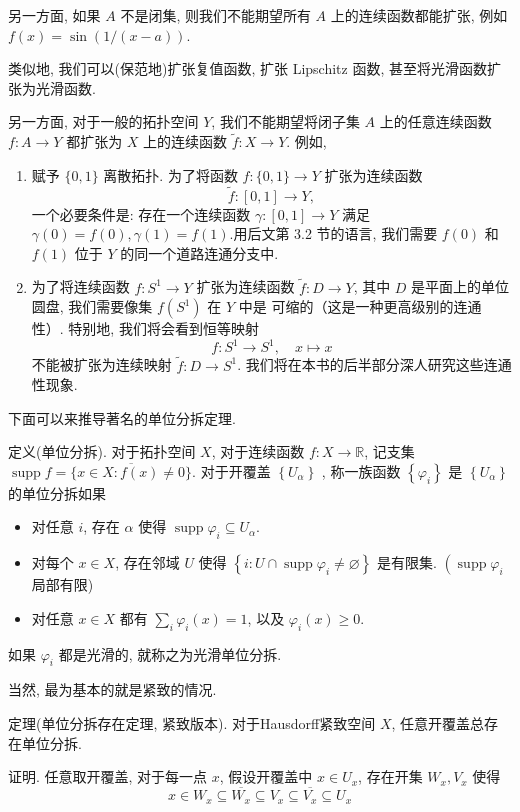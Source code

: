 \documentclass[options]{article}
\begin{document}
另一方面, 如果 $A$ 不是闭集, 则我们不能期望所有 $A$ 上的连续函数都能扩张, 例如 $f(x)=\sin\left(1/(x-a)\right)$.

类似地, 我们可以(保范地)扩张复值函数, 扩张 Lipschitz 函数, 甚至将光滑函数扩张为光滑函数.

另一方面, 对于一般的拓扑空间 $Y$, 我们不能期望将闭子集 $A$ 上的任意连续函数 $f: A \rightarrow Y$ 都扩张为 $X$ 上的连续函数 $\tilde{f}: X \rightarrow Y$. 例如,
\begin{enumerate}
	\item 赋予 $\{0,1\}$ 离散拓扑. 为了将函数 $f:\{0,1\} \rightarrow Y$ 扩张为连续函数
			\[
					\tilde{f}:[0,1] \rightarrow Y,
			\]
			一个必要条件是: 存在一个连续函数 $\gamma:[0,1] \rightarrow Y$ 满足 $\gamma(0)=f(0), \gamma(1)=f(1)$.用后文第 3.2 节的语言, 我们需要 $f(0)$ 和 $f(1)$ 位于 $Y$ 的同一个道路连通分支中.
	\item 为了将连续函数 $f: S^1 \rightarrow Y$ 扩张为连续函数 $\tilde{f}: D \rightarrow Y$, 其中 $D$ 是平面上的单位圆盘, 我们需要像集 $f\left(S^1\right)$ 在 $Y$ 中是 可缩的（这是一种更高级别的连通性）. 特别地, 我们将会看到恒等映射
			\[
					f: S^1 \rightarrow S^1, \quad x \mapsto x
			\]
			不能被扩张为连续映射 $\tilde{f}: D \rightarrow S^1$.
			我们将在本书的后半部分深人研究这些连通性现象.
\end{enumerate}

\begin{remark}
	下面可以来推导著名的单位分拆定理.

	\hrulefill

	定义(单位分拆). 对于拓扑空间 $X$, 对于连续函数 $f: X \rightarrow \mathbb{R}$, 记支集 $\operatorname{supp} f=\overline{\{x \in X: f(x) \neq 0\}}$. 对于开覆盖 $\left\{U_\alpha\right\}$ , 称一族函数 $\left\{\varphi_i\right\}$ 是 $\left\{U_\alpha\right\}$ 的单位分拆如果
\end{remark}
\begin{itemize}
	\item 对任意 $i$, 存在 $\alpha$ 使得 $\operatorname{supp} \varphi_i \subseteq U_\alpha$.
	\item 对每个 $x \in X$, 存在邻域 $U$ 使得 $\left\{i: U \cap \operatorname{supp} \varphi_i \neq \varnothing\right\}$ 是有限集. $\left(\operatorname{supp} \varphi_i\right.$ 局部有限)
	\item 对任意 $x \in X$ 都有 $\sum_i \varphi_i(x)=1$, 以及 $\varphi_i(x) \geq 0$.
\end{itemize}
如果 $\varphi_i$ 都是光滑的, 就称之为光滑单位分拆.

\begin{remark}
	当然, 最为基本的就是紧致的情况.

	\hrulefill

	定理(单位分拆存在定理, 紧致版本). 对于Hausdorff紧致空间 $X$, 任意开覆盖总存在单位分拆.
\end{remark}
证明. 任意取开覆盖, 对于每一点 $x$, 假设开覆盖中 $x \in U_x$, 存在开集 $W_x, V_x$ 使得
\[
		x \in W_x \subseteq \overline{W_x} \subseteq V_x \subseteq \overline{V_x} \subseteq U_x
\]
\end{document}
